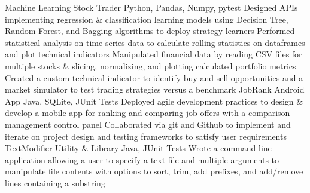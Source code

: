 %
%
%
%
%
\justifiedsubsection%
{Machine Learning Stock Trader}
{Python, Pandas, Numpy, pytest}
%
\workitemsFour%
{%
Designed APIs implementing regression \& classification learning models using Decision Tree, Random Forest, and Bagging algorithms to deploy strategy learners
}%
{%
Performed statistical analysis on time-series data to calculate rolling statistics on dataframes and plot technical indicators
}%
{%
Manipulated financial data by reading CSV files for multiple stocks \& slicing, normalizing, and plotting calculated portfolio metrics
}%
{%
Created a custom technical indicator to identify buy and sell opportunities and a market simulator to test trading strategies versus a benchmark
}%
%
%
%
%
\justifiedsubsection%
{JobRank Android App}
{Java, SQLite, JUnit Tests}
%
\workitemsTwo%
{%
Deployed agile development practices to design \& develop a mobile app for ranking and comparing job offers with a comparison management control panel
}%
{%
Collaborated via git and Github to implement and iterate on project design and testing frameworks to satisfy user requirements
}%
%
%
%
%
\justifiedsubsection%
{TextModifier Utility \& Library}
{Java, JUnit Tests}
%
\workitemsThree%
{%
Wrote a command-line application allowing a user to specify a text file and multiple arguments to manipulate file contents with options to sort, trim, add prefixes, and add/remove lines containing a substring
}%
